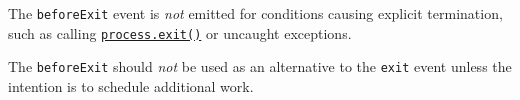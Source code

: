 The \texttt{\textquotesingle{}beforeExit\textquotesingle{}} event is
\emph{not} emitted for conditions causing explicit termination, such as
calling \hyperref[processexitcode]{\texttt{process.exit()}} or uncaught
exceptions.

The \texttt{\textquotesingle{}beforeExit\textquotesingle{}} should
\emph{not} be used as an alternative to the
\texttt{\textquotesingle{}exit\textquotesingle{}} event unless the
intention is to schedule additional work.

\begin{Shaded}
\begin{Highlighting}[]
   \OperatorTok{;}

\NormalTok{(}\OperatorTok{,}\KeywordTok{=\textgreater{}}\NormalTok{ \{}
  \NormalTok{(}\OperatorTok{,}\OperatorTok{;}
\NormalTok{\})}\OperatorTok{;}

\NormalTok{(}\OperatorTok{,}\KeywordTok{=\textgreater{}}\NormalTok{ \{}
  \NormalTok{(}\OperatorTok{,}\OperatorTok{;}
\NormalTok{\})}\OperatorTok{;}

\NormalTok{(}\NormalTok{)}\OperatorTok{;}

\end{Highlighting}
\end{Shaded}

